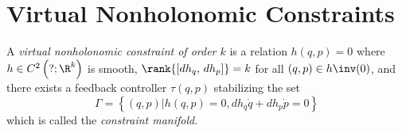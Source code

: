 \section{Virtual Nonholonomic Constraints}

\begin{defn}
    A \textit{virtual nonholonomic constraint of order \(k\)} is a relation
    \(h(q,p) = 0\) where \(h \in C^2\left(? ; \R^k\right)\) is smooth,
    \(\rank{\left[ dh_q,\, dh_p \right]} = k\) for all \((q,p) \in h\inv(0)\),
    and there exists a feedback controller \(\tau(q,p)\) stabilizing the set
    \[
        \Gamma = \left\{(q,p) | h(q,p) = 0, dh_q \dot{q} + dh_p \dot{p} = 0\right\}
    \]
    which is called the \textit{constraint manifold}.
\end{defn}




























